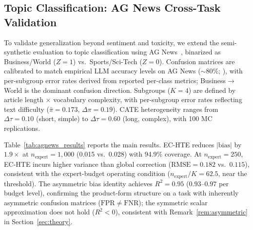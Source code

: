 \subsection{Topic Classification: AG News Cross-Task Validation}
\label{app:agnews}

To validate generalization beyond sentiment and toxicity, we extend the semi-synthetic evaluation to topic classification using AG News~\cite{zhang2015character}, binarized as Business/World ($Z{=}1$) vs.\ Sports/Sci-Tech ($Z{=}0$).
Confusion matrices are calibrated to match empirical LLM accuracy levels on AG News (${\sim}80\%$; \citealt{etaiwi2025comparative}), with per-subgroup error rates derived from reported per-class metrics; Business$\to$World is the dominant confusion direction.
Subgroups ($K{=}4$) are defined by article length $\times$ vocabulary complexity, with per-subgroup error rates reflecting text difficulty ($\bar{\pi} = 0.173$, $\Delta\pi = 0.19$).
CATE heterogeneity ranges from $\Delta\tau{=}0.10$ (short, simple) to $\Delta\tau{=}0.60$ (long, complex), with 100 MC replications.

Table~\ref{tab:agnews_results} reports the main results.
EC-HTE reduces $|\text{bias}|$ by $1.9\times$ at $n_{\text{expert}}{=}1{,}000$ (0.015 vs.\ 0.028) with 94.9\% coverage.
At $n_{\text{expert}}{=}250$, EC-HTE incurs higher variance than global correction ($\text{RMSE}{=}0.182$ vs.\ $0.115$), consistent with the expert-budget operating condition ($n_{\text{expert}}/K{=}62.5$, near the threshold).
The asymmetric bias identity achieves $R^2 = 0.95$ ($0.93$--$0.97$ per budget level), confirming the product-form structure on a task with inherently asymmetric confusion matrices ($\mathrm{FPR} \neq \mathrm{FNR}$); the symmetric scalar approximation does not hold ($R^2 < 0$), consistent with Remark~\ref{rem:asymmetric} in Section~\ref{sec:theory}.

